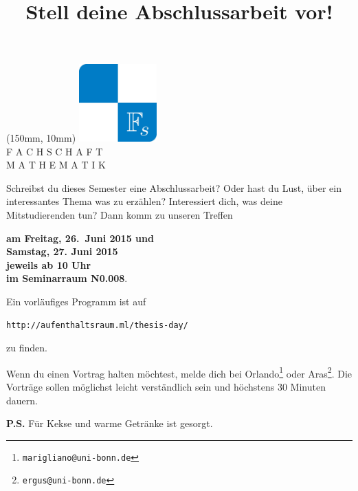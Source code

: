 \documentclass[21pt, a4paper, ngerman]{scrartcl}
\title{\ \\ \large{Stell deine Abschlussarbeit vor!}}
\date{\vspace{-4cm}}
\begin{document}
\maketitle

\begin{textblock*}{50mm}(150mm, 10mm)
\includegraphics[width=30mm]{fs}\\
        \scriptsize
        F A C H S C H A F T\\
        M A T H E M A T I K
\end{textblock*}

Schreibst du dieses Semester eine Abschlussarbeit? Oder hast du Lust,
\"uber ein interessantes Thema was zu erz\"ahlen? Interessiert
dich, was deine Mitstudierenden tun? Dann komm zu unseren Treffen
\begin{center}
\textbf{am Freitag, 26.\ Juni 2015 und \\ Samstag, 27. Juni 2015 \\
jeweils ab 10 Uhr \\ im Seminarraum N0.008}.
\end{center}

Ein vorl\"aufiges Programm ist auf
\begin{center}
\texttt{http://aufenthaltsraum.ml/thesis-day/}
\end{center}
zu finden.

Wenn du einen Vortrag halten m\"ochtest, melde dich bei
Orlando\footnote{\texttt{marigliano@uni-bonn.de}} oder
Aras\footnote{\texttt{ergus@uni-bonn.de}}. Die Vortr\"age sollen m\"oglichst
leicht verst\"andlich sein und h\"ochstens 30 Minuten dauern.

\textbf{P.S.} F\"ur Kekse und warme Getr\"anke ist gesorgt.
\end{document}
